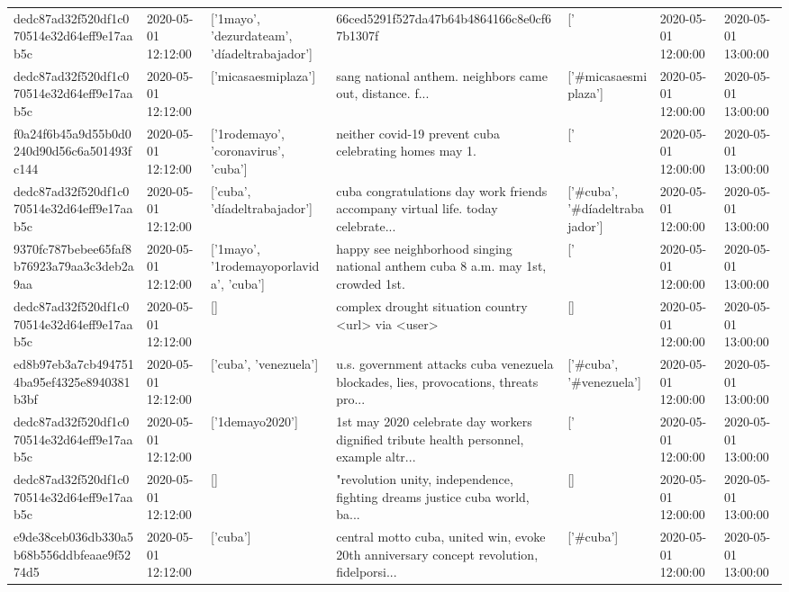 \begin{tabular}{lllllll}
dedc87ad32f520df1c070514e32d64eff9e17aab5c & 2020-05-01 12:12:00 & ['1mayo', 'dezurdateam', 'díadeltrabajador'] & 66ced5291f527da47b64b4864166c8e0cf67b1307f & ['#1mayo', '#dezurdateam', '#díadeltrabajador'] & 2020-05-01 12:00:00 & 2020-05-01 13:00:00 \\
dedc87ad32f520df1c070514e32d64eff9e17aab5c & 2020-05-01 12:12:00 & ['micasaesmiplaza'] & sang national anthem. neighbors came out, distance. f... & ['#micasaesmiplaza'] & 2020-05-01 12:00:00 & 2020-05-01 13:00:00 \\
f0a24f6b45a9d55b0d0240d90d56c6a501493fc144 & 2020-05-01 12:12:00 & ['1rodemayo', 'coronavirus', 'cuba'] & neither covid-19 prevent cuba celebrating homes may 1. & ['#1rodemayo', '#coronavirus', '#cuba'] & 2020-05-01 12:00:00 & 2020-05-01 13:00:00 \\
dedc87ad32f520df1c070514e32d64eff9e17aab5c & 2020-05-01 12:12:00 & ['cuba', 'díadeltrabajador'] & cuba congratulations day work friends accompany virtual life. today celebrate... & ['#cuba', '#díadeltrabajador'] & 2020-05-01 12:00:00 & 2020-05-01 13:00:00 \\
9370fc787bebee65faf8b76923a79aa3c3deb2a9aa & 2020-05-01 12:12:00 & ['1mayo', '1rodemayoporlavida', 'cuba'] & happy see neighborhood singing national anthem cuba 8 a.m. may 1st, crowded 1st. & ['#1mayo', '#1rodemayoporlavida', '#cuba'] & 2020-05-01 12:00:00 & 2020-05-01 13:00:00 \\
dedc87ad32f520df1c070514e32d64eff9e17aab5c & 2020-05-01 12:12:00 & [] & complex drought situation country <url> via <user> & [] & 2020-05-01 12:00:00 & 2020-05-01 13:00:00 \\
ed8b97eb3a7cb4947514ba95ef4325e8940381b3bf & 2020-05-01 12:12:00 & ['cuba', 'venezuela'] & u.s. government attacks cuba venezuela blockades, lies, provocations, threats pro... & ['#cuba', '#venezuela'] & 2020-05-01 12:00:00 & 2020-05-01 13:00:00 \\
dedc87ad32f520df1c070514e32d64eff9e17aab5c & 2020-05-01 12:12:00 & ['1demayo2020'] & 1st may 2020 celebrate day workers dignified tribute health personnel, example altr... & ['#1demayo2020'] & 2020-05-01 12:00:00 & 2020-05-01 13:00:00 \\
dedc87ad32f520df1c070514e32d64eff9e17aab5c & 2020-05-01 12:12:00 & [] & "revolution unity, independence, fighting dreams justice cuba world, ba... & [] & 2020-05-01 12:00:00 & 2020-05-01 13:00:00 \\
e9de38ceb036db330a5b68b556ddbfeaae9f5274d5 & 2020-05-01 12:12:00 & ['cuba'] & central motto cuba, united win, evoke 20th anniversary concept revolution, fidelporsi... & ['#cuba'] & 2020-05-01 12:00:00 & 2020-05-01 13:00:00 \\

\end{tabular}
